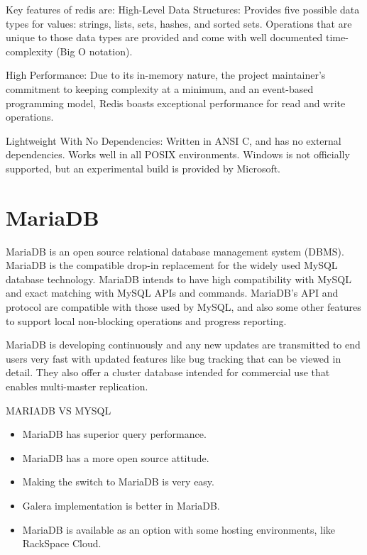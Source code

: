 Key features of redis are:\newline
High-Level Data Structures:  Provides five possible data types for values: strings, lists, sets, hashes, and sorted sets. Operations that are unique to those data types are provided and come with well documented time-complexity (Big O notation).\newline

High Performance:  Due to its in-memory nature, the project maintainer’s commitment to keeping complexity at a minimum, and an event-based programming model, Redis boasts exceptional performance for read and write operations.\newline

Lightweight With No Dependencies:  Written in ANSI C, and has no external dependencies. Works well in all POSIX environments. Windows is not officially supported, but an experimental build is provided by Microsoft.\newline

\section {MariaDB}
MariaDB is an open source relational database management system (DBMS). MariaDB is the compatible drop-in replacement for the widely used MySQL database technology. MariaDB intends to have high compatibility with MySQL and exact matching with MySQL APIs and commands. MariaDB's API and protocol are compatible with those used by MySQL, and also some other features to support local non-blocking operations and progress reporting.\newline

MariaDB is developing continuously and any new updates are transmitted to end users very fast with updated features like bug tracking that can be viewed in detail. They also offer a cluster database intended for commercial use that enables multi-master replication.\newline

MARIADB VS MYSQL\newline
\begin{itemize}
\item MariaDB has superior query performance.
\item MariaDB has a more open source attitude.
\item Making the switch to MariaDB is very easy.
\item Galera implementation is better in MariaDB.
\item MariaDB is available as an option with some hosting environments, like RackSpace Cloud.
\end{itemize}
\newline

